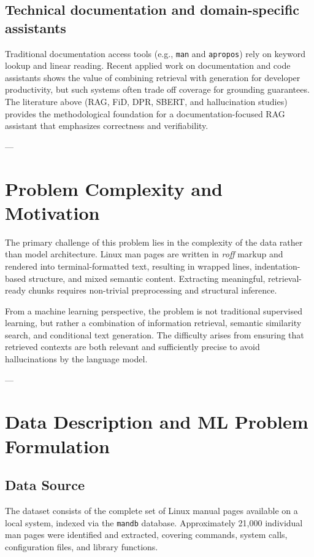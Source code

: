 \documentclass[conference]{IEEEtran}
\begin{document}
\subsection{Technical documentation and domain-specific assistants}

Traditional documentation access tools (e.g., \texttt{man} and \texttt{apropos}) rely on keyword lookup and linear reading. Recent applied work on documentation and code assistants shows the value of combining retrieval with generation for developer productivity, but such systems often trade off coverage for grounding guarantees. The literature above (RAG, FiD, DPR, SBERT, and hallucination studies) provides the methodological foundation for a documentation-focused RAG assistant that emphasizes correctness and verifiability.

---

\section{Problem Complexity and Motivation}

The primary challenge of this problem lies in the complexity of the data rather than model architecture. Linux man pages are written in \textit{roff} markup and rendered into terminal-formatted text, resulting in wrapped lines, indentation-based structure, and mixed semantic content. Extracting meaningful, retrieval-ready chunks requires non-trivial preprocessing and structural inference.

From a machine learning perspective, the problem is not traditional supervised learning, but rather a combination of information retrieval, semantic similarity search, and conditional text generation. The difficulty arises from ensuring that retrieved contexts are both relevant and sufficiently precise to avoid hallucinations by the language model.

---

\section{Data Description and ML Problem Formulation}

\subsection{Data Source}

The dataset consists of the complete set of Linux manual pages available on a local system, indexed via the \texttt{mandb} database. Approximately 21,000 individual man pages were identified and extracted, covering commands, system calls, configuration files, and library functions.
\end{document}
